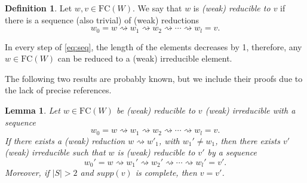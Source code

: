 \documentclass{amsart}
\newcommand{\fc}{{\mathrm{FC}}}
\newcommand{\red}{\rightsquigarrow}
\newtheorem{Lemma}[Theorem]{Lemma}
\theoremstyle{definition}
\newtheorem{Definition}[Theorem]{Definition}
\begin{document}
\begin{Definition}
\label{starred}
Let $w,v\in \fc(W)$. We say that $w$ is \emph{(weak) reducible to $v$} if there is a sequence (also trivial) of (weak) reductions
\begin{equation} \label{eq:seq}
    w_0=w\red w_1\red w_2\red \cdots \red w_l=v.
\end{equation}
\end{Definition}

In every step of \eqref{eq:seq}, the length of the elements decreases by 1, therefore, any $w\in \fc(W)$ can be reduced to a (weak) irreducible element.


The following two results are probably known, but we include their proofs due to the lack of precise references.




\begin{Lemma}
\label{lemma:lemmaseq}
   Let $w\in \fc(W)$ be (weak) reducible to $v$ (weak) irreducible with a sequence
   \begin{equation} \label{eq:primseq}
       w_0=w\red w_1\red w_2\red \cdots \red w_l=v.
   \end{equation}
   If there exists a (weak) reduction $w\red w'_1$, with $w_1'\ne w_1$, then there exists $v'$ (weak) irreducible such that $w$ is (weak) reducible to $v'$ by a sequence  \[w_0'=w\red w_1'\red w_2'\red \cdots \red w_l'=v'.\] Moreover, if $|S|>2$ and $supp(v)$ is complete, then $v=v'$.
\end{Lemma} 
\end{document}
